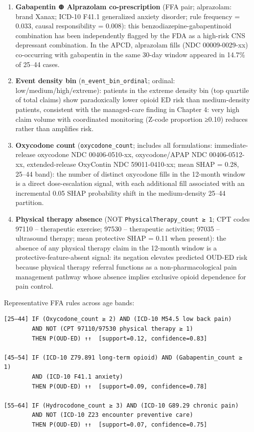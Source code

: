 \documentclass[
  12pt,
]{book}
\begin{document}
\begin{enumerate}
  A score of 4 (four co-prescribed CPIC drugs) increases OUD-ED
  probability by a mean of 0.18 (SHAP delta) over a score of 0.
\item
  \textbf{Gabapentin ⊕ Alprazolam co-prescription} (FFA pair;
  alprazolam: brand Xanax; ICD-10 F41.1 generalized anxiety disorder;
  rule frequency = 0.033, causal responsibility = 0.008): this
  benzodiazepine-gabapentinoid combination has been independently
  flagged by the FDA as a high-risk CNS depressant combination. In the
  APCD, alprazolam fills (NDC 00009-0029-xx) co-occurring with
  gabapentin in the same 30-day window appeared in 14.7\% of 25--44
  cases.
\item
  \textbf{Event density bin} (\texttt{n\_event\_bin\_ordinal}; ordinal:
  low/medium/high/extreme): patients in the extreme density bin (top
  quartile of total claims) show paradoxically lower opioid ED risk than
  medium-density patients, consistent with the managed-care finding in
  Chapter 4: very high claim volume with coordinated monitoring (Z-code
  proportion ≥0.10) reduces rather than amplifies risk.
\item
  \textbf{Oxycodone count} (\texttt{oxycodone\_count}; includes all
  formulations: immediate-release oxycodone NDC 00406-0510-xx,
  oxycodone/APAP NDC 00406-0512-xx, extended-release OxyContin NDC
  59011-0410-xx; mean \textbar SHAP\textbar{} = 0.28, 25--44 band): the
  number of distinct oxycodone fills in the 12-month window is a direct
  dose-escalation signal, with each additional fill associated with an
  incremental 0.05 SHAP probability shift in the medium-density 25--44
  partition.
\item
  \textbf{Physical therapy absence} (NOT
  \texttt{PhysicalTherapy\_count\ ≥\ 1}; CPT codes 97110 -- therapeutic
  exercise; 97530 -- therapeutic activities; 97035 -- ultrasound
  therapy; mean protective \textbar SHAP\textbar{} = 0.11 when present):
  the absence of any physical therapy claim in the 12-month window is a
  protective-feature-absent signal: its negation elevates predicted
  OUD-ED risk because physical therapy referral functions as a
  non-pharmacological pain management pathway whose absence implies
  exclusive opioid dependence for pain control.
\end{enumerate}

Representative FFA rules across age bands:

\begin{verbatim}
[25–44] IF (Oxycodone_count ≥ 2) AND (ICD-10 M54.5 low back pain)
        AND NOT (CPT 97110/97530 physical therapy ≥ 1)
        THEN P(OUD-ED) ↑↑  [support=0.12, confidence=0.83]

[45–54] IF (ICD-10 Z79.891 long-term opioid) AND (Gabapentin_count ≥ 1)
        AND (ICD-10 F41.1 anxiety)
        THEN P(OUD-ED) ↑↑  [support=0.09, confidence=0.78]

[55–64] IF (Hydrocodone_count ≥ 3) AND (ICD-10 G89.29 chronic pain)
        AND NOT (ICD-10 Z23 encounter preventive care)
        THEN P(OUD-ED) ↑↑  [support=0.07, confidence=0.75]
\end{verbatim}
\end{document}

